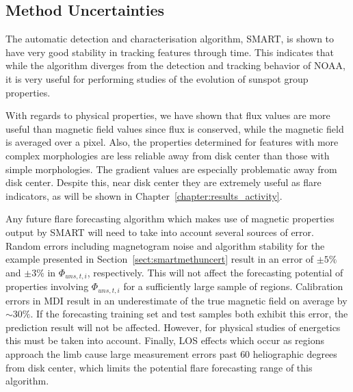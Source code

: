 \subsection{Method Uncertainties}

The automatic detection and characterisation algorithm, \gls{SMART}, is shown to have very good stability in tracking features through time. This indicates that while the algorithm diverges from the detection and tracking behavior of \gls{NOAA}, it is very useful for performing studies of the evolution of sunspot group properties. 

With regards to physical properties, we have shown that flux values are more useful than magnetic field values since flux is conserved, while the magnetic field is averaged over a pixel. Also, the properties determined for features with more complex morphologies are less reliable away from disk center than those with simple morphologies. The gradient values are especially problematic away from disk center. Despite this, near disk center they are extremely useful as flare indicators, as will be shown in Chapter~\ref{chapter:results_activity}.

Any future flare forecasting algorithm which makes use of magnetic properties output by \gls{SMART} will need to take into account several sources of error. Random errors including magnetogram noise and algorithm stability for the example presented in Section~\ref{sect:smartmethuncert} result in an error of $\pm5\%$ and $\pm3\%$ in $\Phi_{uns,t,i}$, respectively. This will not affect the forecasting potential of properties involving ${\Phi}_{uns,t,i}$ for a sufficiently large sample of regions. Calibration errors in MDI result in an underestimate of the true magnetic field on average by $\sim$$30\%$. If the forecasting training set and test samples both exhibit this error, the prediction result will not be affected. However, for physical studies of energetics this must be taken into account. Finally, \gls{LOS} effects which occur as regions approach the limb cause large measurement errors past $60$ heliographic degrees from disk center, which limits the potential flare forecasting range of this algorithm. 

